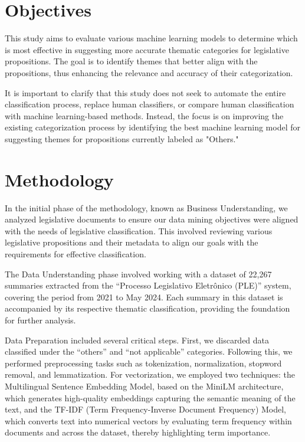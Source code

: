 \documentclass[12pt]{article}
\begin{document}
\section{Objectives}

This study aims to evaluate various machine learning models to determine which is most effective in suggesting more accurate thematic categories for legislative propositions. The goal is to identify themes that better align with the propositions, thus enhancing the relevance and accuracy of their categorization.

It is important to clarify that this study does not seek to automate the entire classification process, replace human classifiers, or compare human classification with machine learning-based methods. Instead, the focus is on improving the existing categorization process by identifying the best machine learning model for suggesting themes for propositions currently labeled as "Others."

\section{Methodology}

In the initial phase of the methodology, known as Business Understanding, we analyzed legislative documents to ensure our data mining objectives were aligned with the needs of legislative classification. This involved reviewing various legislative propositions and their metadata to align our goals with the requirements for effective classification.

The Data Understanding phase involved working with a dataset of 22,267 summaries extracted from the “Processo Legislativo Eletrônico (PLE)” system, covering the period from 2021 to May 2024. Each summary in this dataset is accompanied by its respective thematic classification, providing the foundation for further analysis.

Data Preparation included several critical steps. First, we discarded data classified under the “others” and “not applicable” categories. Following this, we performed preprocessing tasks such as tokenization, normalization, stopword removal, and lemmatization. For vectorization, we employed two techniques: the Multilingual Sentence Embedding Model, based on the MiniLM architecture, which generates high-quality embeddings capturing the semantic meaning of the text, and the TF-IDF (Term Frequency-Inverse Document Frequency) Model, which converts text into numerical vectors by evaluating term frequency within documents and across the dataset, thereby highlighting term importance.
\end{document}
